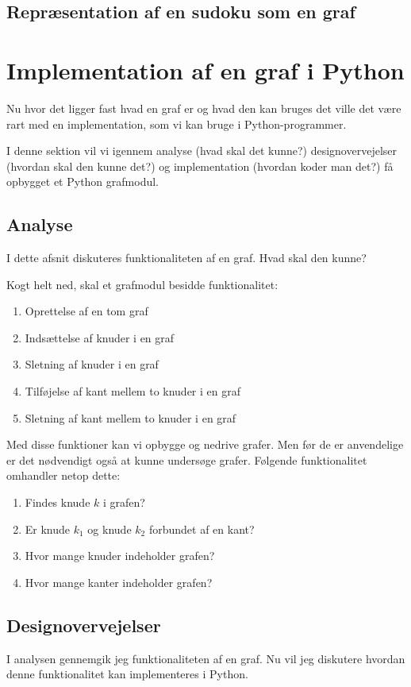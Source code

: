 \documentclass[10pt,a4paper,danish]{article}
\begin{document}
\subsection{Repræsentation af en sudoku som en graf}



\section{Implementation af en graf i Python}
Nu hvor det ligger fast hvad en graf er og hvad den kan bruges det
ville det være rart med en implementation, som vi kan bruge i
Python-programmer.

I denne sektion vil vi igennem analyse (hvad skal det kunne?)
designovervejelser (hvordan skal den kunne det?) og implementation
(hvordan koder man det?) få opbygget et Python grafmodul.

\subsection{Analyse}
\label{sec:analyse}
I dette afsnit diskuteres funktionaliteten af en graf. Hvad skal den
kunne?

Kogt helt ned, skal et grafmodul besidde funktionalitet:
\begin{enumerate}
\item Oprettelse af en tom graf
\item Indsættelse af knuder i en graf
\item Sletning af knuder i en graf
\item Tilføjelse af kant mellem to knuder i en graf
\item Sletning af kant mellem to knuder i en graf
\end{enumerate}

Med disse funktioner kan vi opbygge og nedrive grafer. Men før de er
anvendelige er det nødvendigt også at kunne undersøge grafer. Følgende
funktionalitet omhandler netop dette:
\begin{enumerate}
\item Findes knude $k$ i grafen?
\item Er knude $k_1$ og knude $k_2$ forbundet af en kant?
\item Hvor mange knuder indeholder grafen?
\item Hvor mange kanter indeholder grafen?
\end{enumerate}


\subsection{Designovervejelser}
I analysen  gennemgik jeg funktionaliteten af en
graf. Nu vil jeg diskutere hvordan denne funktionalitet kan
implementeres i Python.
\end{document}
